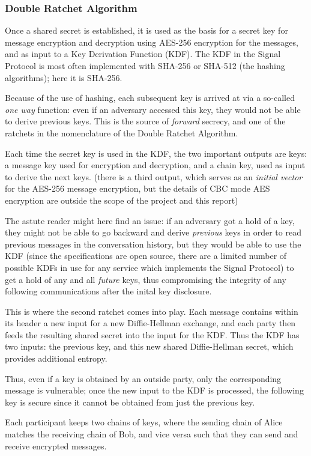 \documentclass[12pt]{article}
\begin{document}
\subsubsection{Double Ratchet Algorithm\parencite{website:sigdocdoubleratchet}}
Once a shared secret is established, it is used as the basis for a secret key for message encryption and decryption using AES-256 encryption for the messages, and as input to a Key Derivation Function (KDF). The KDF in the Signal Protocol is most often implemented with SHA-256 or SHA-512 (the hashing algorithms); here it is SHA-256. \par Because of the use of hashing, each subsequent key is arrived at via a so-called \textit{one way} function: even if an adversary accessed this key, they would not be able to derive previous keys. This is the source of \textit{forward} secrecy, and one of the ratchets in the nomenclature of the Double Ratchet Algorithm.
\par Each time the secret key is used in the KDF, the two important outputs are keys: a message key used for encryption and decryption, and a chain key, used as input to derive the next keys. (there is a third output, which serves as an \textit{initial vector} for the AES-256 message encryption, but the details of CBC mode AES encryption are outside the scope of the project and this report)
\par The astute reader might here find an issue: if an adversary got a hold of a key, they might not be able to go backward and derive \textit{previous} keys in order to read previous messages in the conversation history, but they would be able to use the KDF (since the specifications are open source, there are a limited number of possible KDFs in use for any service which implements the Signal Protocol) to get a hold of any and all \textit{future} keys, thus compromising the integrity of any following communications after the inital key disclosure.
\par This is where the second ratchet comes into play. Each message contains within its header a new input for a new Diffie-Hellman exchange, and each party then feeds the resulting shared secret into the input for the KDF. Thus the KDF has two inputs: the previous key, and this new shared Diffie-Hellman secret, which provides additional entropy.
\par Thus, even if a key is obtained by an outside party, only the corresponding message is vulnerable; once the new input to the KDF is processed, the following key is secure since it cannot be obtained from just the previous key.
\par Each participant keeps two chains of keys, where the sending chain of Alice matches the receiving chain of Bob, and vice versa such that they can send and receive encrypted messages.
\end{document}
